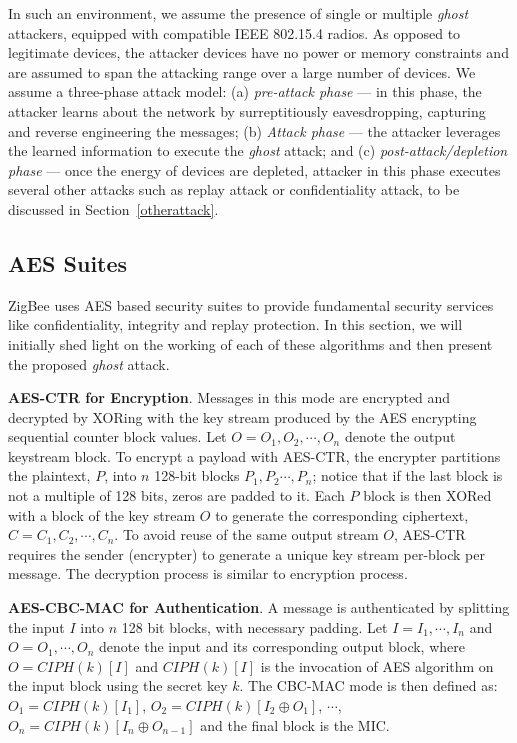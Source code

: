\documentclass[10pt,journal,cspaper,compsoc]{IEEEtran}
\begin{document}
In such an environment, we assume the presence of single or multiple {\em ghost} attackers, equipped with compatible IEEE 802.15.4 radios. As opposed to legitimate devices, the attacker devices have no power or memory constraints and are assumed to span the attacking range over a large number of devices. We assume a three-phase attack model: (a) {\em pre-attack phase} --- in this phase, the attacker learns about the network by surreptitiously eavesdropping, capturing and reverse engineering the messages; (b) {\em Attack phase} --- the attacker leverages the learned information to execute the {\em ghost} attack; and (c) {\em post-attack/depletion phase} --- once the energy of devices are depleted, attacker in this phase executes several other attacks such as replay attack or confidentiality attack, to be discussed in Section~\ref{otherattack}.



\subsection{AES Suites}
ZigBee uses AES \cite{daemen2002design} based security suites to provide fundamental security services like confidentiality, integrity and replay protection. In this section, we will initially shed light on the working of each of these algorithms and then present the proposed {\em ghost} attack.


{\bf AES-CTR for Encryption}.
Messages in this mode are encrypted and decrypted by XORing with the key stream produced by the AES encrypting sequential counter block values. Let $O={O_1,O_2, \cdots, O_n}$  denote the output keystream block. To encrypt a payload with AES-CTR, the encrypter partitions the plaintext, $P$, into $n$ 128-bit blocks ${P_1, P_2 \cdots, P_n}$; notice that if the last block is not a multiple of 128 bits, zeros are padded to it. Each $P$ block is then XORed with a block of the key stream $O$ to generate the corresponding ciphertext, $C={C_1, C_2, \cdots, C_n}$. To avoid reuse of the same output stream $O$, AES-CTR requires the sender (encrypter) to generate a unique key stream per-block per message. The decryption process is similar to encryption process.

{\bf AES-CBC-MAC for Authentication}.
A message is authenticated by splitting the input $I$ into $n$ 128 bit blocks, with necessary padding. Let $I={I_1, \cdots, I_n}$ and $O={O_1, \cdots, O_n}$ denote the input and its corresponding output block, where $O=CIPH(k)[I]$ and $CIPH(k)[I]$ is the invocation of AES algorithm on the  input block using the secret key $k$. The CBC-MAC mode is then defined as: $O_1=CIPH(k)[I_1]$, $O_2=CIPH(k)[I_2 \oplus O_1]$, $\cdots$, $O_n=CIPH(k)[I_n \oplus O_{n-1}]$ and the final block is the MIC.
\end{document}
